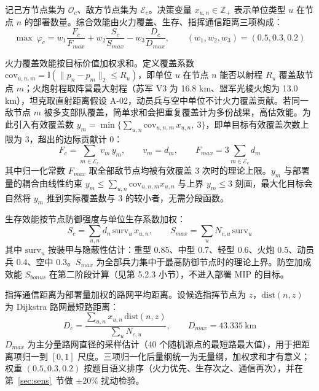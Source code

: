 \documentclass[12pt,a4paper]{ctexart}
\begin{document}
记己方节点集为 $\mathcal{O}_c$、敌方节点集为 $\mathcal{E}_c$。决策变量 $x_{u,n}\in\mathbb{Z}_+$ 表示单位类型 $u$ 在节点 $n$ 的部署数量。综合效能由火力覆盖、生存、指挥通信距离三项构成：
\begin{equation}
\max\ \varphi_c = w_1\frac{F_c}{F_{max}} + w_2\frac{S_c}{S_{max}} - w_3\frac{D_c}{D_{max}},\qquad (w_1,w_2,w_3)=(0.5,0.3,0.2)
\label{eq:phi}
\end{equation}

火力覆盖效能按目标价值加权求和。定义覆盖系数 $\mathrm{cov}_{u,n,m}=\mathbb{I}(\|p_n-p_m\|_2\le R_u)$，即单位 $u$ 在节点 $n$ 能否以射程 $R_u$ 覆盖敌节点 $m$；火炮射程取阵营最大射程（苏军 V3 为 16.8 km、盟军光棱火炮为 13.0 km），坦克取直射距离假设 A-02，动员兵与空中单位不计火力覆盖贡献。若同一敌节点 $m$ 被多支部队覆盖，简单求和会把重复覆盖计为多份战果，高估效能。为此引入有效覆盖数 $y_m=\min\{\sum_{u,n}\mathrm{cov}_{u,n,m}\,x_{u,n},\ 3\}$，即单目标有效覆盖次数上限为 3，超出的边际贡献计 0：
\begin{equation}
F_c=\sum_{m\in\mathcal{E}_c} v_m\,y_m,\qquad v_m=d_m,\qquad F_{max}=3\sum_{m\in\mathcal{E}_c}d_m
\label{eq:F}
\end{equation}
其中归一化常数 $F_{max}$ 取全部敌节点均被有效覆盖 3 次时的理论上限。$y_m$ 与部署量的耦合由线性约束 $y_m\le\sum_{u,n}\mathrm{cov}_{u,n,m}x_{u,n}$ 与上界 $y_m\le 3$ 刻画，最大化目标会自然将 $y_m$ 推到实际覆盖数与 3 的较小者，无需分段函数。

生存效能按节点防御强度与单位生存系数加权：
\begin{equation}
S_c=\sum_{u,n} d_n\,\mathrm{surv}_u\,x_{u,n},\qquad S_{max}=\sum_u N_{c,u}\,\mathrm{surv}_u
\label{eq:S}
\end{equation}
其中 $\mathrm{surv}_u$ 按装甲与隐蔽性估计：重型 0.85、中型 0.7、轻型 0.6、火炮 0.5、动员兵 0.4、空中 0.3。$S_{max}$ 为全部兵力集中于最高防御节点时的理论上界。防空加成效能 $S_{bonus}$ 在第二阶段计算（见第 5.2.3 小节），不进入部署 MIP 的目标。

指挥通信距离为部署量加权的路网平均距离。设候选指挥节点为 $z$，$\mathrm{dist}(n,z)$ 为 Dijkstra 路网最短路距离\cite{ref5}：
\begin{equation}
D_c=\frac{\sum_{u,n}x_{u,n}\,\mathrm{dist}(n,z)}{\sum_u N_{c,u}},\qquad D_{max}=43.335\ \mathrm{km}
\label{eq:D}
\end{equation}
$D_{max}$ 为主分量路网直径的采样估计（40 个随机源点的最短路最大值），用于把距离项归一到 $[0,1]$ 尺度。三项归一化后量纲统一为无量纲，加权求和才有意义；权重 $(0.5,0.3,0.2)$ 按题目语义排序（火力优先、生存次之、通信再次），并在第~\ref{sec:sens}~节做 $\pm20\%$ 扰动检验。
\end{document}
